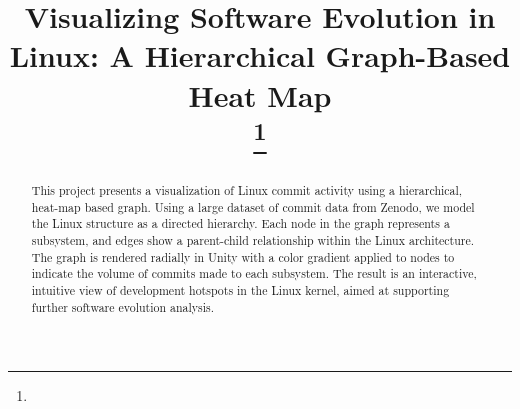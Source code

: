 \documentclass[conference]{IEEEtran}
\begin{document}
\title{Visualizing Software Evolution in Linux: A Hierarchical Graph-Based Heat Map\\

\thanks{}
}

\author{
\and
{}
}



\maketitle

\begin{abstract}
This project presents a visualization of Linux commit activity using a hierarchical, heat-map based graph. Using a large dataset of commit data from Zenodo, we model the Linux structure as a directed hierarchy. Each node in the graph represents a subsystem, and edges show a parent-child relationship within the Linux architecture. The graph is rendered radially in Unity with a color gradient applied to nodes to indicate the volume of commits made to each subsystem. The result is an interactive, intuitive view of development hotspots in the Linux kernel, aimed at supporting further software evolution analysis. 
\end{abstract}
\end{document}
